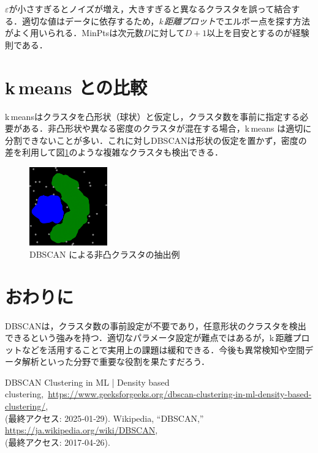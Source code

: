 \documentclass[a4j]{jsarticle}
\begin{document}
$\varepsilon$が小さすぎるとノイズが増え，大きすぎると異なるクラスタを誤って結合する．適切な値はデータに依存するため，\emph{k\,\-距離プロット}でエルボー点を探す方法がよく用いられる．MinPtsは次元数$D$に対して$D+1$以上を目安とするのが経験則である．

\clearpage
\section{k\,\-means との比較}

k\,\-meansはクラスタを凸形状（球状）と仮定し，クラスタ数を事前に指定する必要がある．非凸形状や異なる密度のクラスタが混在する場合，k\,\-means は適切に分割できないことが多い．これに対しDBSCANは形状の仮定を置かず，密度の差を利用して図\ref{fig:dbscan}のような複雑なクラスタも検出できる．

\begin{figure}[htbp]
  \centering
  \includegraphics[width=0.3\textwidth]{31d42bec-0995-4e7d-9d96-cb806a43999e.png}
  \caption{DBSCAN による非凸クラスタの抽出例}
  \label{fig:dbscan}
\end{figure}

\section{おわりに}

DBSCANは，クラスタ数の事前設定が不要であり，任意形状のクラスタを検出できるという強みを持つ．適切なパラメータ設定が難点ではあるが，k\,\-距離プロットなどを活用することで実用上の課題は緩和できる．今後も異常検知や空間データ解析といった分野で重要な役割を果たすだろう．

\begin{thebibliography}{99}
   DBSCAN Clustering in ML | Density based clustering,\
        \url{https://www.geeksforgeeks.org/dbscan-clustering-in-ml-density-based-clustering/},\\
        (最終アクセス: 2025‑01‑29).
   Wikipedia, ``DBSCAN,''\\
        \url{https://ja.wikipedia.org/wiki/DBSCAN},\\
        (最終アクセス: 2017‑04‑26).
\end{thebibliography}
\end{document}
